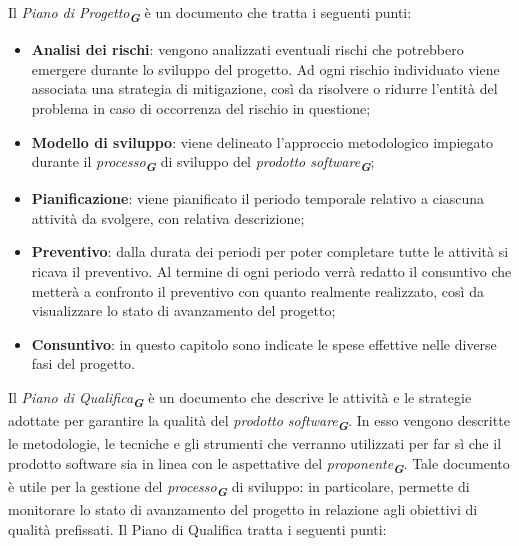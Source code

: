 Il \emph{Piano di Progetto}\textsubscript{\textit{\textbf{G}}} è un documento che tratta i seguenti punti:
\begin{itemize}
    \item \textbf{Analisi dei rischi}: vengono analizzati eventuali rischi che potrebbero emergere durante lo sviluppo del progetto. 
    Ad ogni rischio individuato viene associata una strategia di mitigazione, così da risolvere o ridurre l’entità del problema 
    in caso di occorrenza del rischio in questione;
    \item \textbf{Modello di sviluppo}: viene delineato l’approccio metodologico impiegato durante il
    \emph{processo}\textsubscript{\textit{\textbf{G}}} di sviluppo del \emph{prodotto software}\textsubscript{\textit{\textbf{G}}};
    \item \textbf{Pianificazione}: viene pianificato il periodo temporale relativo a ciascuna attività da svolgere, con relativa descrizione;
    \item \textbf{Preventivo}: dalla durata dei periodi per poter completare tutte le attività si ricava il preventivo. 
    Al termine di ogni periodo verrà redatto il consuntivo che metterà a confronto il preventivo con quanto realmente realizzato, 
    così da visualizzare lo stato di avanzamento del progetto;
    \item \textbf{Consuntivo}: in questo capitolo sono indicate le spese effettive nelle diverse fasi del progetto.
\end{itemize}

Il \emph{Piano di Qualifica}\textsubscript{\textit{\textbf{G}}} è un documento che descrive le attività e le strategie adottate per
garantire la qualità del \emph{prodotto software}\textsubscript{\textit{\textbf{G}}}. In esso vengono descritte le metodologie, le
tecniche e gli strumenti che verranno utilizzati per far sì che il prodotto software sia in linea
con le aspettative del \emph{proponente}\textsubscript{\textit{\textbf{G}}}. Tale documento è utile per la gestione del \emph{processo}\textsubscript{\textit{\textbf{G}}}
di sviluppo: in particolare, permette di monitorare lo stato di avanzamento del progetto in relazione agli obiettivi di qualità prefissati.
Il Piano di Qualifica tratta i seguenti punti:

